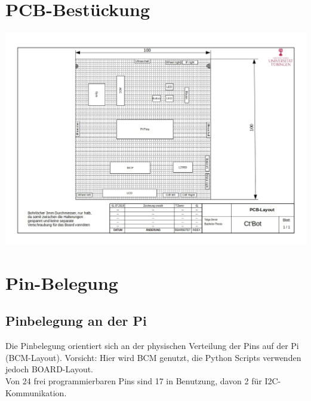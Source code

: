 \documentclass[a4paper,cleardoubleempty,BCOR1cm]{book}
\begin{document}
\section{PCB-Bestückung}
\includegraphics[angle=90,origin=c, scale= 0.7]{images/PCB-Layout.jpg}

\section{Pin-Belegung}
\subsection{Pinbelegung an der Pi}
Die Pinbelegung orientiert sich an der physischen Verteilung der Pins auf der Pi (BCM-Layout). Vorsicht: Hier wird BCM genutzt, die Python Scripts verwenden jedoch BOARD-Layout. \\
Von 24 frei programmierbaren Pins sind 17 in Benutzung, davon 2 für I2C-Kommunikation. 
\end{document}
